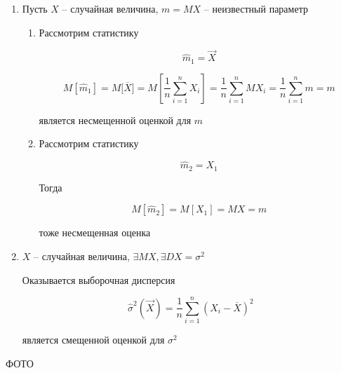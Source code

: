 \begin{example}
    \begin{enumerate}
        \item Пусть $X$ -- случайная величина, $m=MX$ -- неизвестный
            параметр

            \begin{enumerate}
                \item Рассмотрим статистику

                    \begin{equation*}
                        \hat m_1 = \vec X
                    \end{equation*}

                    \begin{equation*}
                        M[\hat m_1] = M\bigg[\overline{X}\bigg] =
                        M[\frac{1}{n} \sum_{i=1}^n X_i] =
                        \frac{1}{n} \sum_{i=1}^n MX_i =
                    \frac{1}{n} \sum_{i=1}^n m = m
                    \end{equation*}

                    является несмещенной оценкой для $m$

                \item Рассмотрим статистику

                    \begin{equation*}
                        \hat m_2 = X_1
                    \end{equation*}

                    Тогда

                    \begin{equation*}
                        M[\hat m_2] = M[X_1] = MX = m
                    \end{equation*}

                    тоже несмещенная оценка
            \end{enumerate}

        \item $X$ -- случайная величина, $\exists MX, \exists DX = \sigma^2$

            Оказывается выборочная дисперсия

            \begin{equation*}
                \hat \sigma^2(\vec X) = \frac{1}{n} \sum_{i=1}^n
                (X_i - \overline{X} )^2
            \end{equation*}

            является смещенной оценкой для $\sigma^2$
    \end{enumerate}

    ФОТО
\end{example}


